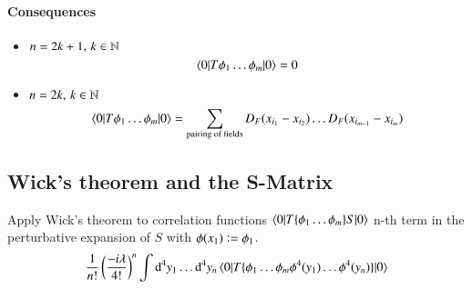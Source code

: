 \paragraph{Consequences}
\begin{itemize}
	\item $n = 2k+1, \, k \in \mathbb{N}$
		\[
		\braket{0 | T \phi_1 \dots \phi_m | 0} = 0
		\]
	\item $n = 2k, \, k \in \mathbb{N}$	
		\[
			\braket{0 | T \phi_1 \dots \phi_m | 0} = \sum_{\text{pairing of fields}} D_F(x_{i_1}-x_{i_2})\dots D_F(x_{i_{m-1}}-x_{i_m})
		\]
\end{itemize}

\subsection{Wick's theorem and the S-Matrix}
Apply Wick's theorem to correlation functions $\braket{0 | T \{\phi_1 \dots \phi_m \} S | 0}$ n-th term in the perturbative expansion of $S$ with $\phi(x_1) \vcentcolon = \phi_1$.
\begin{align*}
	\frac{1}{n!} \left(\frac{-i\lambda}{4!}\right)^n \int \dd^4 y_1 \dots \dd^4 y_n \braket{0 | T \{ \phi_1 \dots \phi_m  \phi^4(y_1) \dots \phi^4(y_n) \} | 0}
\end{align*}

